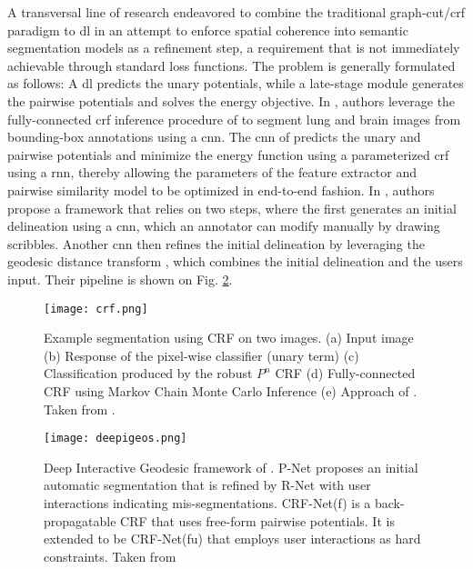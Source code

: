 A transversal line of research endeavored to combine the traditional graph-cut/\gls{crf} paradigm to \gls{dl} in an attempt to enforce spatial coherence into semantic segmentation models as a refinement step, a requirement that is not immediately achievable through standard loss functions.
The problem is generally formulated as follows: A \gls{dl} predicts the unary potentials, while a late-stage module generates the pairwise potentials and solves the energy objective.
In \cite{rajchl16}, authors leverage the fully-connected \gls{crf} inference procedure of \cite{krahenbuhl11} to segment lung and brain images from bounding-box annotations using a \gls{cnn}.
The \gls{cnn} of \cite{rajchl16} predicts the unary and pairwise potentials and minimize the energy function using a parameterized \gls{crf} using a \gls{rnn}, thereby allowing the parameters of the feature extractor and pairwise similarity model to be optimized in end-to-end fashion.
In \cite{wang18}, authors propose a framework that relies on two steps, where the first generates an initial delineation using a \gls{cnn}, which an annotator can modify manually by drawing scribbles.
Another \gls{cnn} then refines the initial delineation by leveraging the geodesic distance transform \cite{criminisi08}, which combines the initial delineation and the users input.
Their pipeline is shown on Fig. \ref{fig:deepigeos}.

\begin{figure}[!h]
  \centering
  \texttt{[image: crf.png]}
  \caption{Example segmentation using CRF on two images. (a) Input image (b) Response of the pixel-wise classifier (unary term) (c) Classification produced by the robust $P^{n}$ CRF \cite{kohli09} (d) Fully-connected CRF using Markov Chain Monte Carlo Inference (e) Approach of \cite{krahenbuhl11}. Taken from \cite{krahenbuhl11}.}
  \label{fig:crf}
\end{figure}

\begin{figure}[!h]
  \centering
  \texttt{[image: deepigeos.png]}
  \caption{Deep Interactive Geodesic framework of \cite{wang18}. P-Net proposes an initial automatic segmentation that is refined by R-Net with user interactions indicating mis-segmentations. CRF-Net(f) is a
    back-propagatable CRF that uses free-form pairwise potentials.
    It is extended to be CRF-Net(fu) that employs user interactions as hard constraints. Taken from \cite{wang18}}
  \label{fig:deepigeos}
\end{figure}

